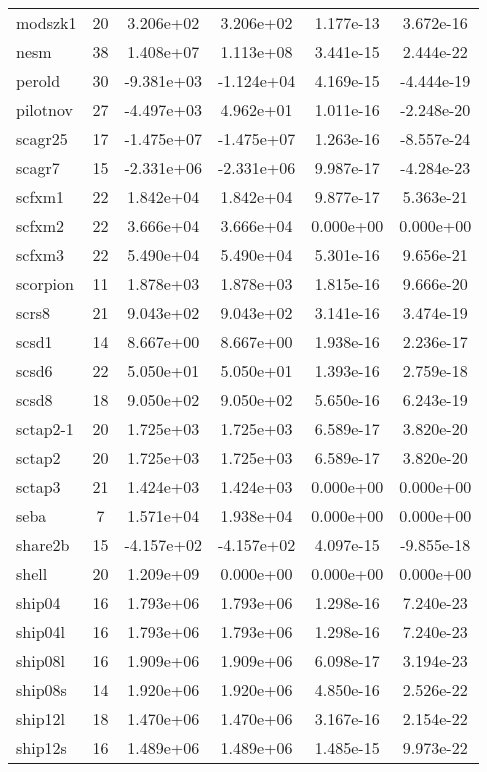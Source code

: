 \documentclass[12pt]{article}
\begin{document}
\begin{longtable}{@{}l|ccccc@{}}
modszk1 & 20 & 3.206e+02 & 3.206e+02 & 1.177e-13 & 3.672e-16 \\
nesm & 38 & 1.408e+07 & 1.113e+08 & 3.441e-15 & 2.444e-22 \\
perold & 30 & -9.381e+03 & -1.124e+04 & 4.169e-15 & -4.444e-19 \\
pilotnov & 27 & -4.497e+03 & 4.962e+01 & 1.011e-16 & -2.248e-20 \\
scagr25 & 17 & -1.475e+07 & -1.475e+07 & 1.263e-16 & -8.557e-24 \\
scagr7 & 15 & -2.331e+06 & -2.331e+06 & 9.987e-17 & -4.284e-23 \\
scfxm1 & 22 & 1.842e+04 & 1.842e+04 & 9.877e-17 & 5.363e-21 \\
scfxm2 & 22 & 3.666e+04 & 3.666e+04 & 0.000e+00 & 0.000e+00 \\
scfxm3 & 22 & 5.490e+04 & 5.490e+04 & 5.301e-16 & 9.656e-21 \\
scorpion & 11 & 1.878e+03 & 1.878e+03 & 1.815e-16 & 9.666e-20 \\
scrs8 & 21 & 9.043e+02 & 9.043e+02 & 3.141e-16 & 3.474e-19 \\
scsd1 & 14 & 8.667e+00 & 8.667e+00 & 1.938e-16 & 2.236e-17 \\
scsd6 & 22 & 5.050e+01 & 5.050e+01 & 1.393e-16 & 2.759e-18 \\
scsd8 & 18 & 9.050e+02 & 9.050e+02 & 5.650e-16 & 6.243e-19 \\
sctap2-1 & 20 & 1.725e+03 & 1.725e+03 & 6.589e-17 & 3.820e-20 \\
sctap2 & 20 & 1.725e+03 & 1.725e+03 & 6.589e-17 & 3.820e-20 \\
sctap3 & 21 & 1.424e+03 & 1.424e+03 & 0.000e+00 & 0.000e+00 \\
seba & 7 & 1.571e+04 & 1.938e+04 & 0.000e+00 & 0.000e+00 \\
share2b & 15 & -4.157e+02 & -4.157e+02 & 4.097e-15 & -9.855e-18 \\
shell & 20 & 1.209e+09 & 0.000e+00 & 0.000e+00 & 0.000e+00 \\
ship04 & 16 & 1.793e+06 & 1.793e+06 & 1.298e-16 & 7.240e-23 \\
ship04l & 16 & 1.793e+06 & 1.793e+06 & 1.298e-16 & 7.240e-23 \\
ship08l & 16 & 1.909e+06 & 1.909e+06 & 6.098e-17 & 3.194e-23 \\
ship08s & 14 & 1.920e+06 & 1.920e+06 & 4.850e-16 & 2.526e-22 \\
ship12l & 18 & 1.470e+06 & 1.470e+06 & 3.167e-16 & 2.154e-22 \\
ship12s & 16 & 1.489e+06 & 1.489e+06 & 1.485e-15 & 9.973e-22 \\

\end{longtable}
\end{document}
